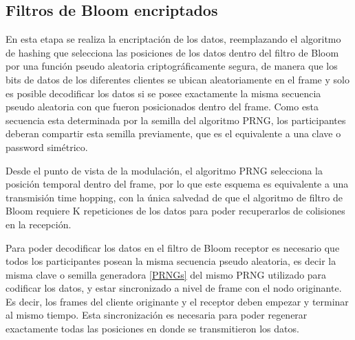 
\subsection{Filtros de Bloom encriptados}

En esta etapa se realiza la encriptación de los datos, reemplazando el algoritmo de hashing que selecciona las posiciones de los datos dentro del filtro de Bloom por una función pseudo aleatoria criptográficamente segura, de manera que los bits de datos de los diferentes clientes se ubican aleatoriamente en el frame y solo es posible decodificar los datos si se posee exactamente la misma secuencia pseudo aleatoria con que fueron posicionados dentro del frame. Como esta secuencia esta determinada por la semilla del algoritmo PRNG, los participantes deberan compartir esta semilla previamente, que es el equivalente a una clave o password simétrico. 

Desde el punto de vista de la modulación, el algoritmo PRNG selecciona la posición temporal dentro del frame, por lo que este esquema es equivalente a una transmisión time hopping, con la única salvedad de que el algoritmo de filtro de Bloom requiere K repeticiones de los datos para poder recuperarlos de colisiones en la recepción.

Para poder decodificar los datos en el filtro de Bloom receptor es necesario que todos los participantes posean la misma secuencia pseudo aleatoria, es decir la misma clave o semilla generadora \ref{PRNGs} del mismo PRNG utilizado para codificar los datos, y estar sincronizado a nivel de frame con el nodo originante. Es decir, los frames del cliente originante y el receptor deben empezar y terminar al mismo tiempo. Esta sincronización es necesaria para poder regenerar exactamente todas las posiciones en donde se transmitieron los datos. 

